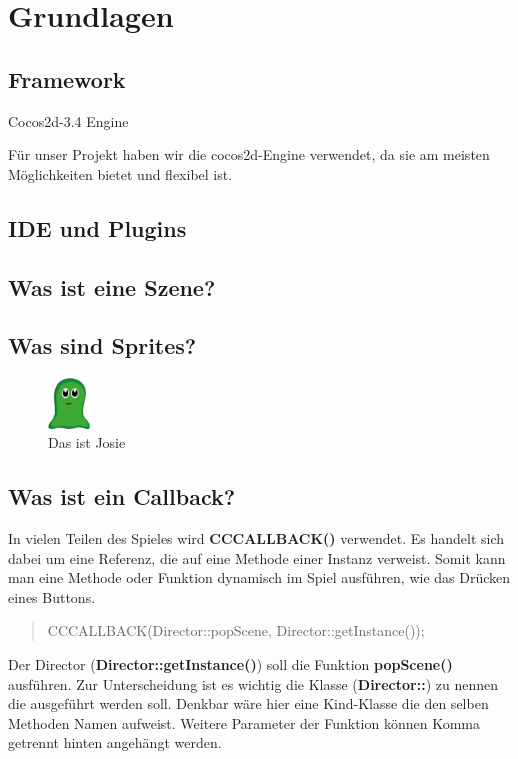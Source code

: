 \chapter{Grundlagen}

\section{Framework}

Cocos2d-3.4 Engine

Für unser Projekt haben wir die cocos2d-Engine verwendet, da sie am meisten Möglichkeiten bietet und flexibel ist.

\section{IDE und Plugins}

\section{Was ist eine Szene?}

\section{Was sind Sprites?}
\begin{figure}[h]
  \includegraphics[width=0.1\textwidth]{resources/josie}
  \caption{Das ist Josie}
  \label{fig:josie} 
\end{figure}


\section{Was ist ein Callback?}

In vielen Teilen des Spieles wird \textbf{CC\textunderscore CALLBACK()} verwendet. Es handelt sich dabei um eine Referenz, die auf eine Methode einer Instanz verweist. Somit kann man eine Methode oder Funktion dynamisch im Spiel ausführen, wie das Drücken eines Buttons.

\begin{quote}
CC\textunderscore CALLBACK(Director::popScene, Director::getInstance());
\end{quote}

Der Director (\textbf{Director::getInstance()}) soll die Funktion \textbf{popScene()} ausführen. Zur Unterscheidung ist es wichtig die Klasse (\textbf{Director::}) zu nennen die ausgeführt werden soll. Denkbar wäre hier eine Kind-Klasse die den selben Methoden Namen aufweist. 
Weitere Parameter der Funktion können Komma getrennt hinten angehängt werden.

